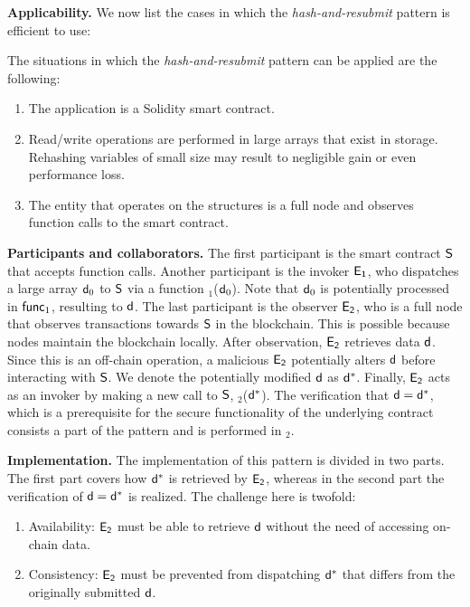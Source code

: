 \noindent
\textbf{Applicability.}
We now list the cases in which the \emph{hash-and-resubmit} pattern is
efficient to use:

The situations in which the \emph{hash-and-resubmit} pattern can be applied are
the following:
\begin{enumerate}
    \item The application is a Solidity smart contract.
    \item Read/write operations are performed in large arrays that exist in
        storage. Rehashing variables of small size may result to negligible
        gain or even performance loss.
    \item The entity that operates on the structures is a full node and
        observes function calls to the smart contract.
\end{enumerate}

\noindent \textbf{Participants and collaborators.} The first participant is the
smart contract $\mathsf{S}$ that accepts function calls. Another participant is
the invoker $\mathsf{E_{1}}$, who dispatches a large array $\mathsf{d}_0$ to $\mathsf{S}$
via a function \texttt{\proc$_1$}($\mathsf{d}_0$). Note that $\mathsf{d}_0$ is
potentially processed in $\textsf{func}_1$, resulting to $\mathsf{d}$. The last participant
is the observer $\mathsf{E_{2}}$, who is a full node that observes transactions
towards $\mathsf{S}$ in the blockchain. This is possible because nodes maintain
the blockchain locally. After observation, $\mathsf{E_{2}}$ retrieves data $\mathsf{d}$.
Since this is an off-chain operation, a malicious $\mathsf{E_{2}}$ potentially
alters $\mathsf{d}$ before interacting with $\mathsf{S}$. We denote the
potentially modified $\mathsf{d}$ as $\mathsf{d^*}$. Finally, $\mathsf{E_{2}}$ acts as an
invoker by making a new call to $\mathsf{S}$, \texttt{\proc$_2$}($\mathsf{d^*}$). The
verification that $\mathsf{d} = \mathsf{d^*}$, which is a prerequisite for the secure
functionality of the underlying contract consists a part of the pattern and is
performed in \texttt{\proc$_2$}.

\noindent \textbf{Implementation.} The implementation of this pattern is
divided in two parts. The first part covers how $\mathsf{d^*}$ is retrieved by
$\mathsf{E_{2}}$, whereas in the second part the verification of $\mathsf{d}=\mathsf{d^*}$ is
realized. The challenge here is twofold:

\begin{enumerate}

    \item Availability: $\mathsf{E_{2}}$ must be able to retrieve $\mathsf{d}$ without
        the need of accessing on-chain data.

    \item Consistency: $\mathsf{E_{2}}$ must be prevented from dispatching $\mathsf{d^*}$
        that differs from the originally submitted $\mathsf{d}$.

\end{enumerate}

